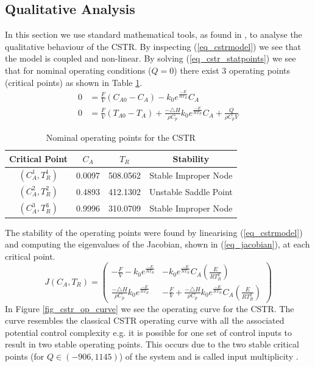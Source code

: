 \documentclass[../masters.tex]{subfiles}
\begin{document}
\subsection{Qualitative Analysis}
In this section we use standard mathematical tools, as found in \cite{edwardsandpenny}, to analyse the qualitative behaviour of the CSTR. By inspecting (\ref{eq_cstrmodel}) we see that the model is coupled and non-linear. By solving (\ref{eq_cstr_statpoints}) we see that for nominal operating conditions ($Q = 0$) there exist 3 operating points (critical points) as shown in Table \ref{tab_nominalstats}.
\begin{equation}
\begin{aligned}
0&= \frac{F}{V}\left( C_{A0}-C_A \right) - k_0e^{\frac{-E}{RT_R}}C_A \\
0 &= \frac{F}{V}\left(T_{A0}-T_A\right) + \frac{-\triangle H}{\rho C_p}k_0e^{\frac{-E}{RT_R}}C_A + \frac{Q}{\rho C_p V}
\end{aligned}
\label{eq_cstr_statpoints}
\end{equation}
\begin{table}[H]
\begin{center}
\begin{tabular}{c c c c}
\hline
Critical Point & $C_A$ & $T_R$ & Stability\\
\hline
$\left(C_A^1, T_R^1\right)$ & 0.0097 & 508.0562 & Stable Improper Node\\
$\left(C_A^2, T_R^2\right)$ & 0.4893 & 412.1302 & Unstable Saddle Point \\
$\left(C_A^3, T_R^3 \right)$ & 0.9996 & 310.0709 & Stable Improper Node \\
\hline
\end{tabular}
\caption{Nominal operating points for  the CSTR}
\label{tab_nominalstats}
\end{center}
\end{table}
The stability of the operating points were found by linearising (\ref{eq_cstrmodel}) and computing the eigenvalues of the Jacobian, shown in (\ref{eq_jacobian}), at each critical point.
\begin{equation}
J(C_A, T_R) = \begin{pmatrix}
-\frac{F}{V} - k_0e^{\frac{-E}{RT_R}} & - k_0e^{\frac{-E}{RT_R}}C_A\left(\frac{E}{RT_R^2}\right) \\
\frac{-\triangle H}{\rho C_p}k_0e^{\frac{-E}{RT_R}} & -\frac{F}{V} + \frac{-\triangle H}{\rho C_p}k_0e^{\frac{-E}{RT_R}}C_A\left(\frac{E}{RT_R^2}\right) 
\end{pmatrix}
\label{eq_jacobian}
\end{equation}
In Figure \ref{fig_cstr_op_curve} we see the operating curve for the CSTR. The curve resembles the classical CSTR operating curve with all the associated potential control complexity e.g. it is possible for one set of control inputs to result in two stable operating points. This occurs due to the two stable critical points (for $Q\in (-906, 1145)$) of the system and is called input multiplicity \cite{luyben}. 
\end{document}

